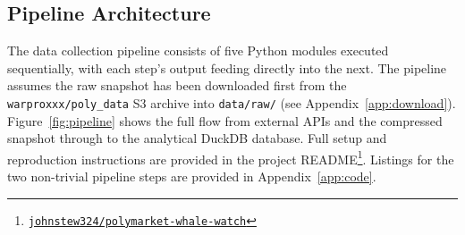 \subsection{Pipeline Architecture}
\label{sec:pipeline}

The data collection pipeline consists of five Python modules executed
sequentially, with each step's output feeding directly into the next.
The pipeline assumes the raw snapshot has been downloaded first from
the \texttt{warproxxx/poly\_data} S3 archive into \texttt{data/raw/}
(see Appendix~\ref{app:download}).
Figure~\ref{fig:pipeline} shows the full flow from external APIs and
the compressed snapshot through to the analytical DuckDB database.
Full setup and reproduction instructions are provided in the project
README\footnote{\href{https://github.com/johnstew324/polymarket-whale-watch}{%
\faGithub\;\texttt{johnstew324/polymarket-whale-watch}}}.
Listings for the two non-trivial pipeline steps are provided in
Appendix~\ref{app:code}.

